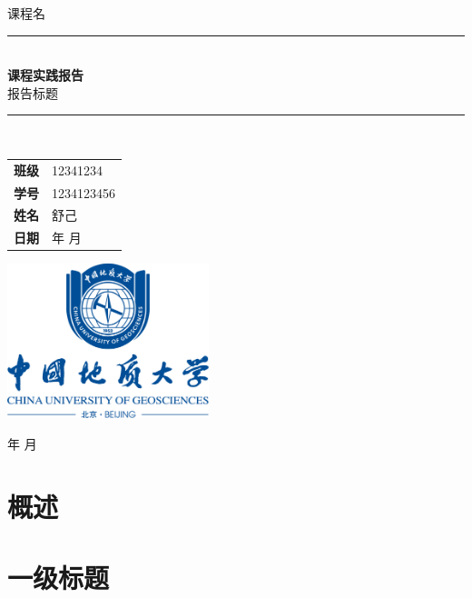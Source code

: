 \documentclass[12pt,a4paper]{article}
\begin{document}
\renewcommand{\today}{\number\year 年 \number\month 月}
\begin{titlepage}
    \clearpage\thispagestyle{empty}
    \centering
    \vspace{1cm}

    {\fangsong 课程名}
    \vspace{2.5cm}

    \rule{\linewidth}{2mm} \\[0.5cm]
    { \Huge \kaishu \textbf{课程实践报告}\\[0.2em]
    报告标题}\\[0.5cm]
    \rule{\linewidth}{0.6mm} \\[3.4cm]

    \hspace{2cm}
    \begin{tabular}{l p{5cm}}
        \textbf{班级} & 12341234   \\[18pt]
        \textbf{学号} & 1234123456 \\[18pt]
        \textbf{姓名} & 舒己       \\[18pt]
        \textbf{日期} & \today
    \end{tabular}

    \vspace{1.5cm}
    \centering \includegraphics[height=4.5cm]{校徽与中英文（蓝色中轴式）.png}\\ %
    \vspace{1.5cm}
    \begin{center}
        \today
    \end{center}
\end{titlepage}
\tableofcontents\thispagestyle{empty}
\newpage
\setcounter{page}{1}
\section{概述}

\section{一级标题}
\end{document}
